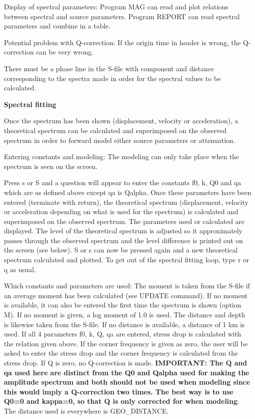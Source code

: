 Display of spectral parameters: Program MAG can read and plot relations between spectral and source parameters. Program REPORT can read spectral parameters and combine in a table. 

Potential problem with Q-correction: If the origin time in header is wrong, the Q-correction can be very wrong.  

There must be a phase line in the S-file with component and distance corresponding to the spectra made in order for the spectral values to be calculated. 

\textbf{Spectral fitting}

Once the spectrum has been shown (displacement, velocity or acceleration), a theoretical spectrum can be calculated and superimposed on the observed spectrum in order to forward model either source parameters or attenuation. 

Entering constants and modeling: The modeling can only take place when the spectrum is seen on the screen. 

Press s or S and a question will appear to enter the constants f0, k, Q0 and qa which are as defined above except qa is Qalpha. Once these parameters have been entered (terminate with return), the theoretical spectrum (displacement, velocity or acceleration depending on what is used for the spectrum) is calculated and superimposed on the observed spectrum. The parameters used or calculated are displayed. The level of the theoretical spectrum is adjusted so it approximately passes through the observed spectrum and the level difference is printed out on the screen (see below). S or s can now be pressed again and a new theoretical spectrum calculated and plotted. To get out of the spectral fitting loop, type r or q as usual. 

Which constants and parameters are used: The moment is taken from the S-file if an average moment has been calculated (see UPDATE command). If no moment is available, it can also be entered the first time the spectrum is shown (option M). If no moment is given, a log moment of 1.0 is used. The distance and depth is likewise taken from the S-file. If no distance is available, a distance of 1 km is used. If all 4 parameters f0, k, Q, qa are entered, stress drop is calculated with the relation given above. If the corner frequency is given as zero, the user will be asked to enter the stress drop and the corner frequency is calculated from the stress drop. If Q is zero, no Q-correction is made. \textbf{IMPORTANT: The Q and qa used here are distinct from the Q0 and Qalpha used for making the amplitude spectrum and both should not be used when modeling since this would imply  a Q-correction two times. The best way is to use Q0=0 and kappa=0, so that Q is only corrected for when modeling}. The distance used is everywhere is GEO\_DISTANCE. 

